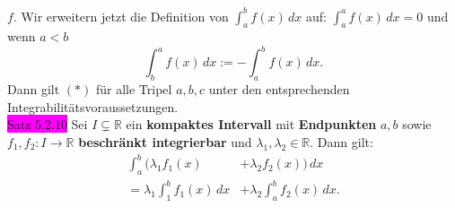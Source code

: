 \documentclass[landscape, 10pt]{article}
\newcommand{\R}{\mathbb{R}}
\begin{document}
\begin{multicols}{3}
                     \textcolor{NavyBlue}{$f$}. Wir
                     erweitern jetzt die Definition von 
                     \textcolor{NavyBlue}{$\int_a^bf(x)\,dx$} 
                     auf: 
                     \textcolor{NavyBlue}{$\int_a^af(x)\,dx=0$} 
                     und wenn 
                     \textcolor{NavyBlue}{$a<b$}
                     \begin{equation*}
                            \int_b^af(x)\,dx
                            :=-\int_a^bf(x)\,dx.
                     \end{equation*}
                     Dann gilt $(*)$ für alle Tripel 
                     \textcolor{NavyBlue}{$a,b,c$} 
                     unter den entsprechenden 
                     Integrabilitätsvoraussetzungen. \\
              \colorbox{magenta}{Satz 5.2.10}
                     Sei \textcolor{NavyBlue}{$I\subsetneq\R$} 
                     ein \textbf{kompaktes Intervall} 
                     mit \textbf{Endpunkten} 
                     \textcolor{NavyBlue}{$a,b$} sowie 
                     \textcolor{NavyBlue}{
                     $f_1,f_2:I\longrightarrow\R$}
                     \textbf{beschränkt 
                     integrierbar} und 
                     \textcolor{NavyBlue}{
                     $\lambda_1,\lambda_2\in\R$}. 
                     Dann gilt: 
                     \begin{align*}
                            \int_a^b(\lambda_1f_1(x)
                            &+\lambda_2f_2(x))\,dx \\
                            =\lambda_1\int_1^bf_1(x)\,dx
                            &+\lambda_2\int_a^bf_2(x)\,dx.
                     \end{align*}

\end{multicols}
\end{document}
